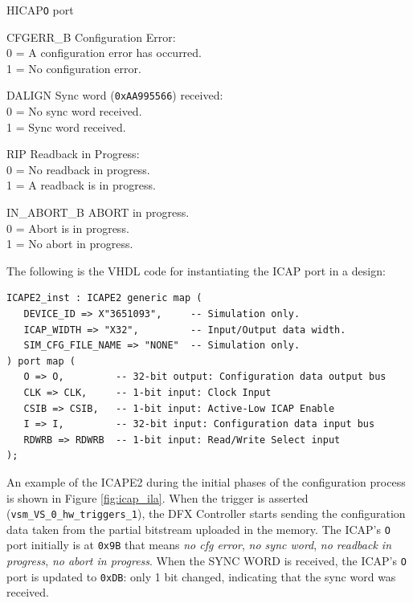 \begin{center}
\begin{register}{H}{ICAP}{\texttt{O} port}%
%
%
%
%
%
\begin{regdesc}\begin{reglist}
\item [CFGERR\_B]Configuration Error:\\0 = A configuration error has occurred.\\1 = No configuration error.
\item [DALIGN]Sync word (\texttt{0xAA995566}) received:\\0 = No sync word received.\\1 = Sync word received.
\item [RIP]Readback in Progress:\\0 = No readback in progress.\\1 = A readback is in progress.
\item [IN\_ABORT\_B]ABORT in progress.\\0 = Abort is in progress.\\1 = No abort in progress.
\end{reglist}\end{regdesc}
\end{register}
\end{center}

The following is the VHDL code for instantiating the ICAP port in a design:

\begin{lstlisting}[style=VHDL]
ICAPE2_inst : ICAPE2 generic map (
   DEVICE_ID => X"3651093",     -- Simulation only.
   ICAP_WIDTH => "X32",         -- Input/Output data width.
   SIM_CFG_FILE_NAME => "NONE"  -- Simulation only.
) port map (
   O => O,         -- 32-bit output: Configuration data output bus
   CLK => CLK,     -- 1-bit input: Clock Input
   CSIB => CSIB,   -- 1-bit input: Active-Low ICAP Enable
   I => I,         -- 32-bit input: Configuration data input bus
   RDWRB => RDWRB  -- 1-bit input: Read/Write Select input
);
\end{lstlisting}

An example of the ICAPE2 during the initial phases of the configuration process is shown in Figure \ref{fig:icap_ila}. When the trigger is asserted (\texttt{vsm\_VS\_0\_hw\_triggers\_1}), the DFX Controller starts sending the configuration data taken from the partial bitstream uploaded in the memory. The ICAP's \texttt{O} port initially is at \texttt{0x9B} that means \textit{no cfg error}, \textit{no sync word}, \textit{no readback in progress}, \textit{no abort in progress}. When the SYNC WORD is received, the ICAP's \texttt{O} port is updated to \texttt{0xDB}: only 1 bit changed, indicating that the sync word was received.

